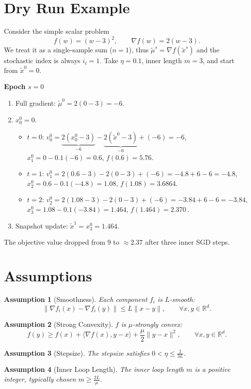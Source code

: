 \documentclass{article}
\newtheorem{assumption}{Assumption}
\newcommand{\R}{\mathbb{R}}
\begin{document}
\section*{Dry Run Example}
Consider the simple scalar problem
\[
f(w)= (w-3)^{2},\qquad \nabla f(w)=2(w-3).
\]
We treat it as a single‑sample sum ($n=1$), thus $\tilde{\mu}^{s}= \nabla f(\tilde{x}^{s})$ and the stochastic index is always $i_t=1$.
Take $\eta=0.1$, inner length $m=3$, and start from $\tilde{x}^{0}=0$.

\medskip
\noindent\textbf{Epoch $s=0$}
\begin{enumerate}
\item Full gradient: $\tilde{\mu}^{0}=2(0-3)=-6$.
\item $x_{0}^{0}=0$.
\begin{itemize}
\item $t=0$: $v_{0}^{0}= \underbrace{2(x_{0}^{0}-3)}_{-6}-\underbrace{2(\tilde{x}^{0}-3)}_{-6}+(-6)=-6$,
          $x_{1}^{0}=0-0.1(-6)=0.6$, $f(0.6)=5.76$.
\item $t=1$: $v_{1}^{0}=2(0.6-3)-2(0-3)+(-6)= -4.8+6-6=-4.8$, 
          $x_{2}^{0}=0.6-0.1(-4.8)=1.08$, $f(1.08)=3.6864$.
\item $t=2$: $v_{2}^{0}=2(1.08-3)-2(0-3)+(-6)= -3.84+6-6=-3.84$, 
          $x_{3}^{0}=1.08-0.1(-3.84)=1.464$, $f(1.464)=2.370\,$.
\end{itemize}
\item Snapshot update: $\tilde{x}^{1}=x_{3}^{0}=1.464$.
\end{enumerate}
The objective value dropped from $9$ to $\approx2.37$ after three inner SGD steps.

\section*{Assumptions}
\begin{assumption}[Smoothness]\label{as:smooth}
Each component $f_i$ is $L$‑smooth:
\[
\|\nabla f_i(x)-\nabla f_i(y)\|\le L\|x-y\|,\qquad\forall x,y\in\R^{d}.
\]
\end{assumption}
\begin{assumption}[Strong Convexity]\label{as:strong}
$f$ is $\mu$‑strongly convex:
\[
f(y)\ge f(x)+\langle\nabla f(x),y-x\rangle+\frac{\mu}{2}\|y-x\|^{2},
\qquad\forall x,y\in\R^{d}.
\]
\end{assumption}
\begin{assumption}[Stepsize]\label{as:stepsize}
The stepsize satisfies $0<\eta\le\frac{1}{3L}$.
\end{assumption}
\begin{assumption}[Inner Loop Length]\label{as:inner}
The inner loop length $m$ is a positive integer, typically chosen $m\ge \frac{2L}{\mu}$.
\end{assumption}
\end{document}
